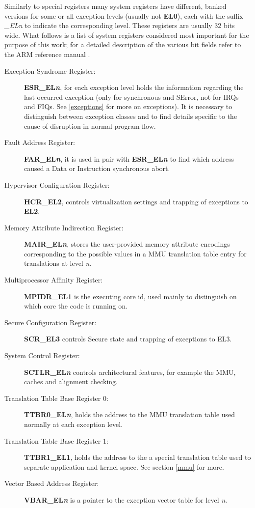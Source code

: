 \documentclass[12pt,a4paper,openright,twoside]{report}
\begin{document}
Similarly to special registers many system registers have different, banked versions
for some or all exception levels (usually not \textbf{EL0}), each with the
suffix \textit{\_ELn} to indicate the corresponding level.
These registers are usually 32 bits wide. What follows is a list of system registers
considered most important for the purpose of this work; for a detailed description
of the various bit fields refer to the ARM reference manual \cite{armarm}.
\begin{description}
    \item[Exception Syndrome Register:] \textbf{ESR\_EL\textit{n}}, for each exception 
        level holds the information regarding the last occurred exception (only
        for synchronous and SError, not for IRQs and FIQs. See \ref{exceptions}
        for more on exceptions). It is necessary to distinguish between exception
        classes and to find details specific to the cause of disruption in normal
        program flow.
    \item[Fault Address Register:] \textbf{FAR\_EL\textit{n}}, it is used in pair 
        with \textbf{ESR\_EL\textit{n}} to find which address caused a Data or 
        Instruction synchronous abort.
    \item[Hypervisor Configuration Register:] \textbf{HCR\_EL2}, controls 
    virtualization settings and trapping of exceptions to \textbf{EL2}.
    \item[Memory Attribute Indirection Register:] \textbf{MAIR\_EL\textit{n}}, 
        stores the user-provided memory attribute encodings corresponding to the
        possible values in a MMU translation table entry for translations at level \textit{n}.
    \item[Multiprocessor Affinity Register:] \textbf{MPIDR\_EL1} is the 
        executing core id, used mainly to distinguish on which core the code is 
        running on.
    \item[Secure Configuration Register:] \textbf{SCR\_EL3} controls Secure 
    state and trapping of exceptions to EL3.
    \item[System Control Register:] \textbf{SCTLR\_EL\textit{n}} controls 
    architectural features, for example the MMU, caches and alignment checking.
    \item[Translation Table Base Register 0:] \textbf{TTBR0\_EL\textit{n}}, holds
        the address to the MMU translation table used normally at each exception level.
    \item[Translation Table Base Register 1:] \textbf{TTBR1\_EL1}, holds
        the address to the a special translation table used to separate application
        and kernel space. See section \ref{mmu} for more.
    \item[Vector Based Address Register:] \textbf{VBAR\_EL\textit{n}} is a pointer 
        to the exception vector table for level \textit{n}.
\end{description}
\end{document}
